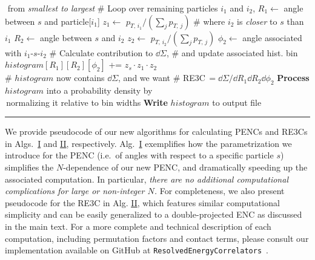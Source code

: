 \begin{table}
\begin{minipage}{0.58\textwidth}
\begin{algorithmic}[1]
            \State
            \qquad\,\,from \textit{smallest to largest}
            \State \textcolor{codegreen!80!black}{\# Loop over remaining particles $i_1$ and $i_2$,}
                \State $R_1 \gets$ angle between $s$ and particle[$i_1$]
                \State $z_1 \gets $ \(p_{T,\, i_1}/(\sum_j p_{T,\,j})\)
                \State \textcolor{codegreen!80!black}{\# where $i_2$ is \textit{closer} to $s$ than $i_1$}
                    \State $R_2 \gets$ angle between $s$ and $i_2$
                    \State $z_2 \gets $ \(p_{T,\, i_2}/(\sum_j p_{T,\,j})\)
                    \State $\phi_2 \gets $ angle associated with $i_1$-$s$-$i_2$
                    \State \textcolor{codegreen!80!black}{\# Calculate contribution to $\dd\Sigma$,}
                    \State \textcolor{codegreen!80!black}{\# and update associated hist. bin}
                    \State
                    $histogram[R_1][R_2][\phi_2]$
                    +=
                    $z_s \cdot z_1 \cdot z_2$
                \EndFor
            \EndFor
        \EndFor
    \EndFor
    \\
    \State \textcolor{codegreen!80!black}{\# $histogram$ now contains $\dd\Sigma$, and we want}
    \State \textcolor{codegreen!80!black}{\# RE3C$\,=\dd \Sigma/\dd R_1 \dd R_2 \dd \phi_2$}
    \State \textbf{Process} $histogram$ into a probability density by
    \\
    \qquad\qquad\,normalizing it relative to bin widths
    \State \textbf{Write} $histogram$ to output file
\end{algorithmic}
\vspace{8pt}
\hrule height 1.3pt
\end{minipage}
\end{table}

\vspace{10pt}

We provide pseudocode of our new algorithms for calculating PENCs and RE3Cs in Algs.~\hyperlink{alg:penc}{I} and  \hyperlink{alg:re3c}{II}, respectively.
%
Alg.~\hyperlink{alg:penc}{I} exemplifies how the parametrization we introduce for the PENC (i.e.~of angles with respect to a specific particle $s$) simplifies the $N$-dependence of our new PENC, and dramatically speeding up  the associated computation.
%
In particular, \emph{there are no additional computational complications for large or non-integer \(N\).}
%
For completeness, we also present pseudocode for the RE3C in Alg. \hyperlink{alg:re3c}{II}, which features similar computational simplicity and can be easily generalized to a double-projected ENC as discussed in the main text.
%
For a more complete and technical description of each computation, including permutation factors and contact terms, please consult our implementation available on GitHub at \texttt{ResolvedEnergyCorrelators}~\cite{github:RENC}.


